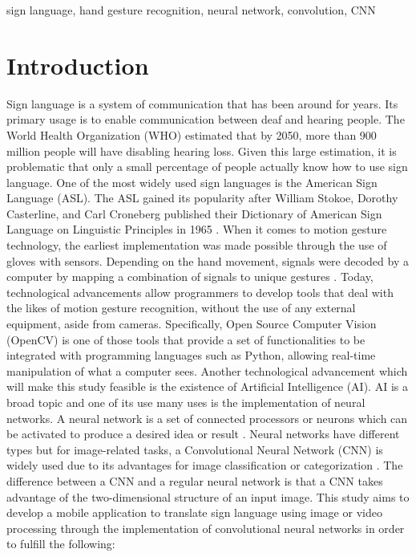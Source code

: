 \documentclass[journal]{./IEEE/IEEEtran}
\title{\SPTITLE}
\author{\ADVISEE~and~\ADVISER%
\REMARK
}
\begin{document}
\maketitle


\begin{keywords}
sign language, hand gesture recognition, neural network, convolution, CNN
\end{keywords}

\section{Introduction}
Sign language is a system of communication that has been around for years. Its primary usage is to enable communication between deaf and hearing people. The World Health Organization (WHO) \cite{WHO2018} estimated that by 2050, more than 900 million people will have disabling hearing loss. Given this large estimation, it is problematic that only a small percentage of people actually know how to use sign language. One of the most widely used sign languages is the American Sign Language (ASL). The ASL gained its popularity after William Stokoe, Dorothy Casterline, and Carl Croneberg published their Dictionary of American Sign Language on Linguistic Principles in 1965 \cite{Wilcox1991}.
\newline
\indent When it comes to motion gesture technology, the earliest implementation was made possible through the use of gloves with sensors. Depending on the hand movement, signals were decoded by a computer by mapping a combination of signals to unique gestures \cite{Sharma2015}.  Today, technological advancements allow programmers to develop tools that deal with the likes of motion gesture recognition, without the use of any external equipment, aside from cameras. Specifically, Open Source Computer Vision (OpenCV) is one of those tools that provide a set of functionalities to be integrated with programming languages such as Python, allowing real-time manipulation of what a computer sees.
\newline
\indent Another technological advancement which will make this study feasible is the existence of Artificial Intelligence (AI). AI is a broad topic and one of its use many uses is the implementation of neural networks. A neural network is a set of connected processors or neurons which can be activated to produce a desired idea or result \cite{Schmidhuber2015}. Neural networks have different types but for image-related tasks, a Convolutional Neural Network (CNN) is widely used due to its advantages for image classification or categorization \cite{Wu2016}. The difference between a CNN and a regular neural network is that a CNN takes advantage of the two-dimensional structure of an input image.
\newline
\indent This study aims to develop a mobile application to translate sign language using image or video processing through the implementation of  convolutional neural networks in order to fulfill the following:
\end{document}
